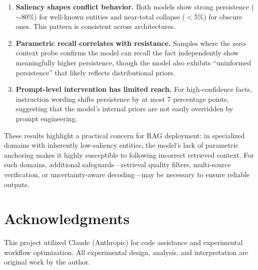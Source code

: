 \documentclass[11pt, letterpaper]{article}
\begin{document}
\begin{enumerate}[nosep]
    \item \textbf{Saliency shapes conflict behavior.} Both models show strong persistence ($\sim$80\%) for well-known entities and near-total collapse ($<$5\%) for obscure ones. This pattern is consistent across architectures.
    \item \textbf{Parametric recall correlates with resistance.} Samples where the zero-context probe confirms the model can recall the fact independently show meaningfully higher persistence, though the model also exhibits ``uninformed persistence'' that likely reflects distributional priors.
    \item \textbf{Prompt-level intervention has limited reach.} For high-confidence facts, instruction wording shifts persistence by at most 7 percentage points, suggesting that the model's internal priors are not easily overridden by prompt engineering.
\end{enumerate}

These results highlight a practical concern for RAG deployment: in specialized domains with inherently low-saliency entities, the model's lack of parametric anchoring makes it highly susceptible to following incorrect retrieved context. For such domains, additional safeguards---retrieval quality filters, multi-source verification, or uncertainty-aware decoding---may be necessary to ensure reliable outputs.

\section*{Acknowledgments}

This project utilized Claude (Anthropic) for code assistance and experimental workflow optimization. All experimental design, analysis, and interpretation are original work by the author.



\end{document}
